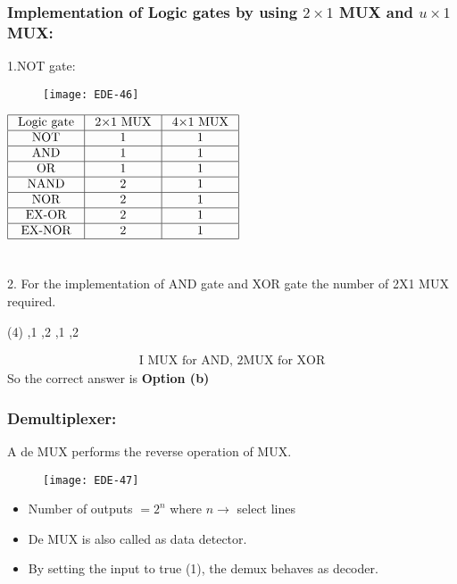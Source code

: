 \subsubsection{Implementation of Logic gates by using $2 \times 1$ MUX and $u \times 1$ MUX:}
1.\quad NOT gate:
\begin{figure}[H]
	\centering
	\texttt{[image: EDE-46]}
\end{figure}
\renewcommand*{\arraystretch}{1.5}
$\begin{array}{|c|c|c|}
\hline\text { Logic gate } & \text { 2$\times$1 MUX } & \text { 4$\times$1 MUX } \\
\hline \text { NOT } & 1 & 1 \\
\hline \text { AND } & 1 & 1 \\
\hline \text { OR } & 1 & 1 \\
\hline \text { NAND } & 2 & 1\\
\hline \text { NOR } & 2 & 1\\
\hline \text { EX-OR } & 2 & 1\\
\hline \text { EX-NOR } & 2 & 1\\	\hline
\end{array}$\\\\\\
2. \quad For the implementation of AND gate and XOR gate the number of 2X1 MUX required.
\begin{tasks}(4)
	,1
	,2
	,1
	,2
\end{tasks}
\begin{answer}
	\begin{align*}
	\text { I MUX for AND, 2MUX for XOR }
	\end{align*}
	So the correct answer is \textbf{Option (b)}
\end{answer}
\subsubsection{Demultiplexer:}
A de MUX performs the reverse operation of MUX.
\begin{figure}[H]
	\centering
	\texttt{[image: EDE-47]}
\end{figure}
\begin{itemize}
	\item Number of outputs $=2^{n}$ where $n \rightarrow$ select lines
	\item  De MUX is also called as data detector.
	\item By setting the input to true (1), the demux behaves as decoder.
\end{itemize}

